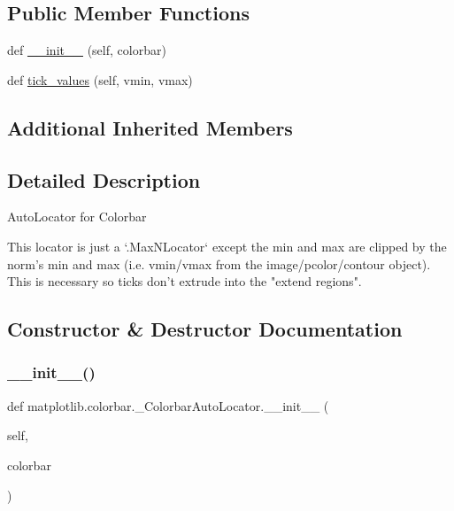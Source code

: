 \subsection*{Public Member Functions}
\begin{DoxyCompactItemize}
\item 
def \hyperlink{classmatplotlib_1_1colorbar_1_1__ColorbarAutoLocator_ad1706cbfe4ca55a0eae05e6f37955ceb}{\+\_\+\+\_\+init\+\_\+\+\_\+} (self, colorbar)
\item 
def \hyperlink{classmatplotlib_1_1colorbar_1_1__ColorbarAutoLocator_a7f3c83f7213196d8673ed7fc82a7dda5}{tick\+\_\+values} (self, vmin, vmax)
\end{DoxyCompactItemize}
\subsection*{Additional Inherited Members}


\subsection{Detailed Description}
\begin{DoxyVerb}AutoLocator for Colorbar

This locator is just a `.MaxNLocator` except the min and max are
clipped by the norm's min and max (i.e. vmin/vmax from the
image/pcolor/contour object).  This is necessary so ticks don't
extrude into the "extend regions".
\end{DoxyVerb}
 

\subsection{Constructor \& Destructor Documentation}
\mbox{\label{classmatplotlib_1_1colorbar_1_1__ColorbarAutoLocator_ad1706cbfe4ca55a0eae05e6f37955ceb}} 
\subsubsection{\texorpdfstring{\+\_\+\+\_\+init\+\_\+\+\_\+()}{\_\_init\_\_()}}
{\footnotesize\ttfamily def matplotlib.\+colorbar.\+\_\+\+Colorbar\+Auto\+Locator.\+\_\+\+\_\+init\+\_\+\+\_\+ (\begin{DoxyParamCaption}\item[{}]{self,  }\item[{}]{colorbar }\end{DoxyParamCaption})}


